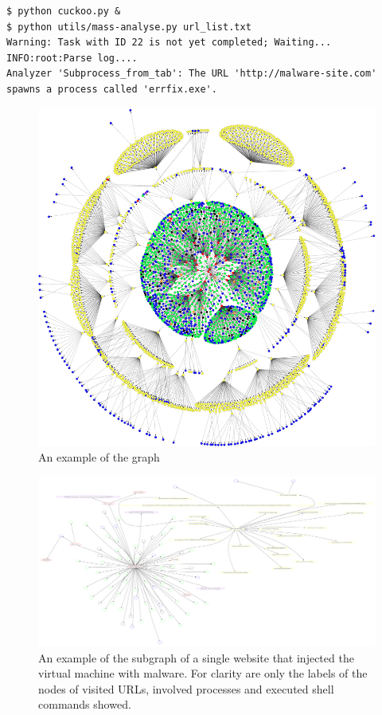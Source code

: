 \begin{lstlisting}
$ python cuckoo.py &
$ python utils/mass-analyse.py url_list.txt
Warning: Task with ID 22 is not yet completed; Waiting...
INFO:root:Parse log....
Analyzer 'Subprocess_from_tab': The URL 'http://malware-site.com' 
spawns a process called 'errfix.exe'.
\end{lstlisting}

\begin{figure}[h]
    \centering
    \includegraphics[width=20cm]{Images/graph2.png}
    \caption{An example of the graph}
    \label{fig:graph}
\end{figure}
\restoregeometry

\begin{figure}[h]
    \centering
    \includegraphics[width=25cm, angle=90]{Images/report_Subprocess_from_tab}
    \caption{An example of the subgraph of a single website that injected the virtual machine with malware. For clarity are only the labels of the nodes of visited URLs, involved processes and executed shell commands showed.}
    \label{fig:subgraph}
\end{figure}

